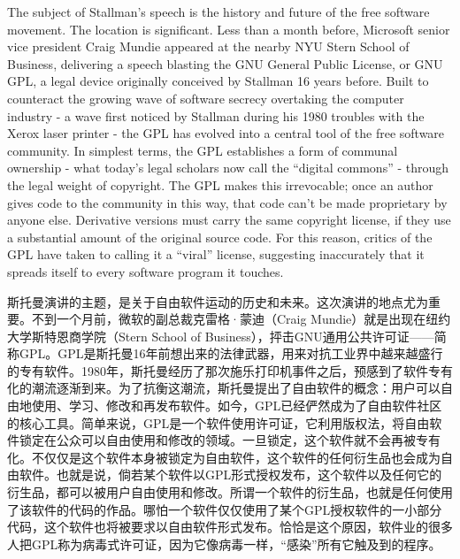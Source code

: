 The subject of Stallman's speech is the history and future of the free software movement. The location is significant. Less than a month before, Microsoft senior vice president Craig Mundie appeared at the nearby NYU Stern School of Business, delivering a speech blasting the GNU General Public License, or GNU GPL, a legal device originally conceived by Stallman 16 years before. Built to counteract the growing wave of software secrecy overtaking the computer industry - a wave first noticed by Stallman during his 1980 troubles with the Xerox laser printer - the GPL has evolved into a central tool of the free software community. In simplest terms, the GPL establishes a form of communal ownership - what today's legal scholars now call the ``digital commons'' - through the legal weight of copyright. The GPL makes this irrevocable; once an author gives code to the community in this way, that code can't be made proprietary by anyone else. Derivative versions must carry the same copyright license, if they use a substantial amount of the original source code. For this reason, critics of the GPL have taken to calling it a ``viral'' license, suggesting inaccurately that it spreads itself to every software program it touches.
\fi
\fi

\ifdefined\chs
斯托曼演讲的主题，是关于自由软件运动的历史和未来。这次演讲的地点尤为重要。不到一个月前，微软的副总裁克雷格·蒙迪（Craig Mundie）就是出现在纽约大学斯特恩商学院（Stern School of Business），抨击GNU通用公共许可证——简称GPL。GPL是斯托曼16年前想出来的法律武器，用来对抗工业界中越来越盛行的专有软件。1980年，斯托曼经历了那次施乐打印机事件之后，预感到了软件专有化的潮流逐渐到来。为了抗衡这潮流，斯托曼提出了自由软件的概念：用户可以自由地使用、学习、修改和再发布软件。如今，GPL已经俨然成为了自由软件社区的核心工具。简单来说，GPL是一个软件使用许可证，它利用版权法，将自由软件锁定在公众可以自由使用和修改的领域。一旦锁定，这个软件就不会再被专有化。不仅仅是这个软件本身被锁定为自由软件，这个软件的任何衍生品也会成为自由软件。也就是说，倘若某个软件以GPL形式授权发布，这个软件以及任何它的衍生品，都可以被用户自由使用和修改。所谓一个软件的衍生品，也就是任何使用了该软件的代码的作品。哪怕一个软件仅仅使用了某个GPL授权软件的一小部分代码，这个软件也将被要求以自由软件形式发布。恰恰是这个原因，软件业的很多人把GPL称为病毒式许可证，因为它像病毒一样，``感染''所有它触及到的程序。

